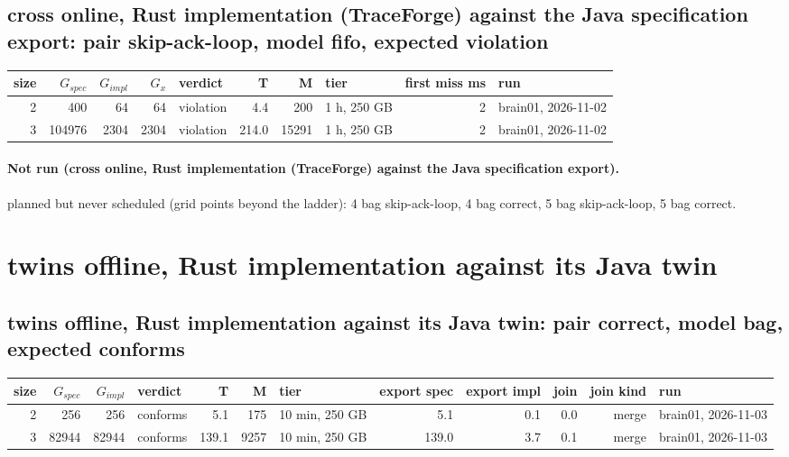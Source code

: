 \documentclass[10pt]{article}
\begin{document}
\subsection*{cross online, Rust implementation (TraceForge) against the Java specification export: pair \textsf{skip-ack-loop}, model fifo, expected violation}
\begin{longtable}{@{}rrrrlrrlrl@{}}
\toprule
size & $G_{\mathit{spec}}$ & $G_{\mathit{impl}}$ & $G_x$ & verdict & T & M & tier & first miss ms & run \\
\midrule
\endhead
\color{red} 2 & 400 & 64 & 64 & violation & 4.4 & 200 & 1 h, 250 GB & 2 & brain01, 2026-11-02 \\
\color{red} 3 & 104976 & 2304 & 2304 & violation & 214.0 & 15291 & 1 h, 250 GB & 2 & brain01, 2026-11-02 \\
\bottomrule
\end{longtable}
\paragraph{Not run (cross online, Rust implementation (TraceForge) against the Java specification export).}
planned but never scheduled (grid points beyond the ladder): 4 bag skip-ack-loop, 4 bag correct, 5 bag skip-ack-loop, 5 bag correct.\par
\section*{twins offline, Rust implementation against its Java twin}
\subsection*{twins offline, Rust implementation against its Java twin: pair \textsf{correct}, model bag, expected conforms}
\begin{longtable}{@{}rrrlrrlrrrrl@{}}
\toprule
size & $G_{\mathit{spec}}$ & $G_{\mathit{impl}}$ & verdict & T & M & tier & export spec & export impl & join & join kind & run \\
\midrule
\endhead
\color{blue} 2 & 256 & 256 & conforms & 5.1 & 175 & 10 min, 250 GB & 5.1 & 0.1 & 0.0 & merge & brain01, 2026-11-03 \\
\color{blue} 3 & 82944 & 82944 & conforms & 139.1 & 9257 & 10 min, 250 GB & 139.0 & 3.7 & 0.1 & merge & brain01, 2026-11-03 \\
\bottomrule
\end{longtable}
\end{document}
